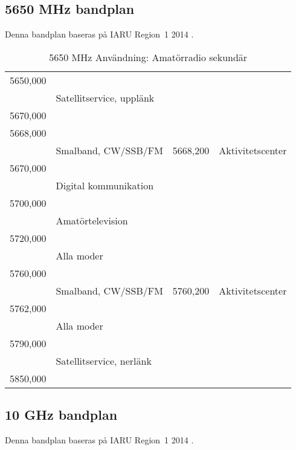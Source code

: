 \subsection{5650 MHz bandplan}
\label{5650MHzbandplan}
Denna bandplan baseras på IARU Region~1 2014 \cite{IARU1}.

\setlongtables
\begin{longtable}{llll}
\caption{5650 MHz Användning: Amatörradio sekundär} \\
5650,000 & & & \\
         & \multicolumn{3}{l}{Satellitservice, upplänk} \\
5670,000 & & & \\
5668,000 & & & \\
         & Smalband, CW/SSB/FM & 5668,200 & Aktivitetscenter \\
5670,000 & & & \\
         & Digital kommunikation & & \\
5700,000 & & & \\
         & Amatörtelevision & & \\
5720,000 & & & \\
         & Alla moder & & \\
5760,000 & & & \\
         & Smalband, CW/SSB/FM & 5760,200 & Aktivitetscenter \\
5762,000 & & & \\
         & Alla moder & & \\
5790,000 & & & \\
         & \multicolumn{3}{l}{Satellitservice, nerlänk} \\
5850,000 & & & \\
\end{longtable}

\subsection{10 GHz bandplan}
\label{10GHzbandplan}
Denna bandplan baseras på IARU Region~1 2014 \cite{IARU1}.

